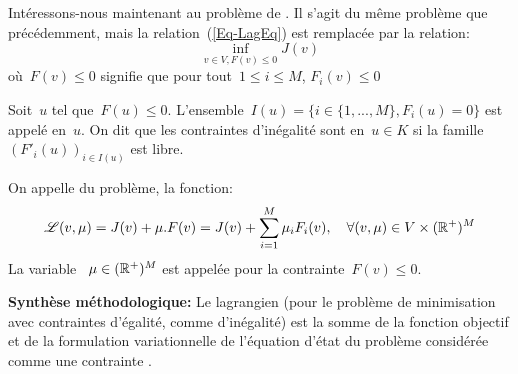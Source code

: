 \medskip
Intéressons-nous maintenant au problème de .
Il s'agit du même problème que précédemment, mais la relation~(\ref{Eq-LagEq}) est remplacée par la relation:
\begin{equation}\label{Eq-LagIneq}
\inf_{v\in V, F(v)\le0} J(v)
\end{equation}
où~$F(v)\le0$ signifie que pour tout~$1\le i\le M$, $F_i(v)\le0$

\begin{definition}
Soit~$u$ tel que~$F(u)\le0$.
L'ensemble~$I(u)=\{i\in\{1, ..., M\}, F_i(u)=0\}$ est appelé  en~$u$.
On dit que les contraintes d'inégalité sont  en~$u\in K$ si la famille~$(F'_i(u))_{i\in I(u)}$ est libre.
\end{definition}

\begin{definition}
On appelle  du problème, la fonction:
\begin{equation}
\mathscr{L}(v,\mu) = J(v)+\mu.F(v) = J(v) + \displaystyle\sum_{i=1}^M \mu_iF_i(v), 
\quad \forall (v,\mu)\in V\times(\mathbb R^+)^M
\end{equation}
La variable ~$\mu\in(\mathbb R^+)^M$ est appelée  pour la contrainte~$F(v)\le0$.
\end{definition}

\noindent\textbf{Synthèse méthodologique:} Le lagrangien (pour le problème de minimisation avec contraintes d'égalité, comme d'inégalité) est la somme de la fonction objectif et de la formulation variationnelle de l'équation d'état du problème considérée comme une contrainte .

